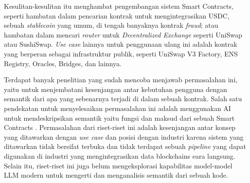 Kesulitan-kesulitan itu menghambat pengembangan sistem Smart Contracts, seperti hambatan dalam pencarian kontrak untuk mengintegrasikan USDC, sebuah \textit{stablecoin} yang umum, di tengah banyaknya kontrak \textit{fraud}; atau hambatan dalam mencari \textit{router} untuk \textit{Decentralized Exchange} seperti UniSwap atau SushiSwap. \textit{Use case} lainnya untuk penggunaan ulang ini adalah kontrak yang berperan sebagai infrastruktur publik, seperti UniSwap V3 Factory, ENS Registry, Oracles, Bridges, dan lainnya.

Terdapat banyak penelitian yang sudah mencoba menjawab permasalahan ini, yaitu untuk menjembatani kesenjangan antar kebutuhan pengguna dengan semantik dari apa yang sebenarnya terjadi di dalam sebuah kontrak. Salah satu pendekatan untuk menyelesaikan permasalahan ini adalah menggunakan AI untuk mendeskripsikan semantik yaitu fungsi dan maksud dari sebuah Smart Contracts \parencite{zhang2021smart} \parencite{stan} \parencite{shi2021semantic} \parencite{shi2021semantic}. Permasalahan dari riset-riset ini adalah kesenjangan antar konsep yang ditawarkan dengan \textit{use case} dan posisi dengan industri karena sistem yang ditawarkan tidak bersifat terbuka dan tidak terdapat sebuah \textit{pipeline} yang dapat digunakan di industri yang mengintegrasikan data blockchains eara langsung. Selain itu, riset-riset ini juga belum mengeksplorasi kapabilitas model-model LLM modern untuk mengerti dan menganalisis semantik dari sebuah kode.




% 



% 

